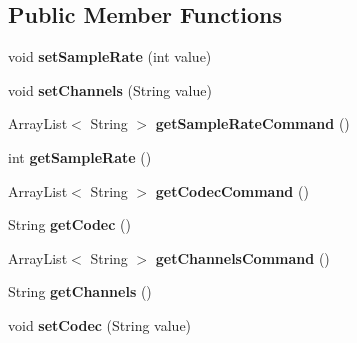 \subsection*{Public Member Functions}
\begin{DoxyCompactItemize}
\item 
\hypertarget{classvideo_1_1_audio_profile_a118cc7576eb28a36691baadac74c89a2}{
void {\bfseries setSampleRate} (int value)}
\label{classvideo_1_1_audio_profile_a118cc7576eb28a36691baadac74c89a2}

\item 
\hypertarget{classvideo_1_1_audio_profile_a1db50e5fc6f1eaa9466346cbb62aca66}{
void {\bfseries setChannels} (String value)}
\label{classvideo_1_1_audio_profile_a1db50e5fc6f1eaa9466346cbb62aca66}

\item 
\hypertarget{classvideo_1_1_audio_profile_a8fc2d8da463a9fae7ba9f4e2aa941c9a}{
ArrayList$<$ String $>$ {\bfseries getSampleRateCommand} ()}
\label{classvideo_1_1_audio_profile_a8fc2d8da463a9fae7ba9f4e2aa941c9a}

\item 
\hypertarget{classvideo_1_1_audio_profile_ad11a6151efb60f0671d4162afe5ee1e0}{
int {\bfseries getSampleRate} ()}
\label{classvideo_1_1_audio_profile_ad11a6151efb60f0671d4162afe5ee1e0}

\item 
\hypertarget{classvideo_1_1_audio_profile_a093ea8a22e05294ef742c6994d9fddd5}{
ArrayList$<$ String $>$ {\bfseries getCodecCommand} ()}
\label{classvideo_1_1_audio_profile_a093ea8a22e05294ef742c6994d9fddd5}

\item 
\hypertarget{classvideo_1_1_audio_profile_a2de5870ed12467edd5f33bd587500cba}{
String {\bfseries getCodec} ()}
\label{classvideo_1_1_audio_profile_a2de5870ed12467edd5f33bd587500cba}

\item 
\hypertarget{classvideo_1_1_audio_profile_a60254cbbc6a9fa8c2ae5a87ce3649616}{
ArrayList$<$ String $>$ {\bfseries getChannelsCommand} ()}
\label{classvideo_1_1_audio_profile_a60254cbbc6a9fa8c2ae5a87ce3649616}

\item 
\hypertarget{classvideo_1_1_audio_profile_a2aaa47260838a1dc4f3e95477b95dfe3}{
String {\bfseries getChannels} ()}
\label{classvideo_1_1_audio_profile_a2aaa47260838a1dc4f3e95477b95dfe3}

\item 
\hypertarget{classvideo_1_1_audio_profile_aa550e99ec2822c8e857b33584144df50}{
void {\bfseries setCodec} (String value)}
\label{classvideo_1_1_audio_profile_aa550e99ec2822c8e857b33584144df50}


\end{DoxyCompactItemize}
